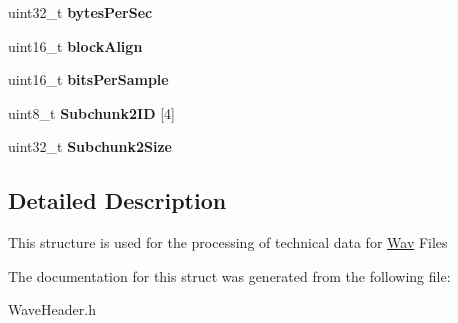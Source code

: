 \begin{DoxyCompactItemize}
uint32\+\_\+t {\bfseries bytes\+Per\+Sec}
\item 
\mbox{\label{structWAV__HEADER_a76dfa6919ab8e0c0e23e3b5086fd0532}} 
uint16\+\_\+t {\bfseries block\+Align}
\item 
\mbox{\label{structWAV__HEADER_a69b1f7eaf6fa6710872af779cfd0253f}} 
uint16\+\_\+t {\bfseries bits\+Per\+Sample}
\item 
\mbox{\label{structWAV__HEADER_ae32e7cc9495dfc7dd5e7b9b7ce1b8cee}} 
uint8\+\_\+t {\bfseries Subchunk2\+ID} \mbox{[}4\mbox{]}
\item 
\mbox{\label{structWAV__HEADER_ad9f3b2b7f6be8608fc92057278ce1595}} 
uint32\+\_\+t {\bfseries Subchunk2\+Size}
\end{DoxyCompactItemize}


\subsection{Detailed Description}
This structure is used for the processing of technical data for \hyperlink{classWav}{Wav} Files 

The documentation for this struct was generated from the following file\+:\begin{DoxyCompactItemize}
\item 
Wave\+Header.\+h\end{DoxyCompactItemize}
